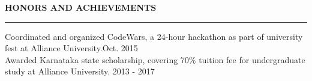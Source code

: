 \documentclass[a4paper]{article}
\newcommand{\myline}{\par
  \kern2pt %
  \hrule height 0.5pt
  \kern2pt %
}
\newcommand{\mybullet}{
	\indent \textbullet \hspace*{2mm}
}
\begin{document}
	\noindent
	{\large \textbf{HONORS AND ACHIEVEMENTS}}
	\myline 
	\smallskip

		\mybullet Coordinated and organized CodeWars, a 24-hour hackathon as part of 
		university fest at Alliance University.\hfill Oct. 2015\\
		\mybullet Awarded Karnataka state scholarship, covering 70\% tuition fee for undergraduate 
		study at Alliance University. \hfill 2013 - 2017 \\
		
\end{document}
